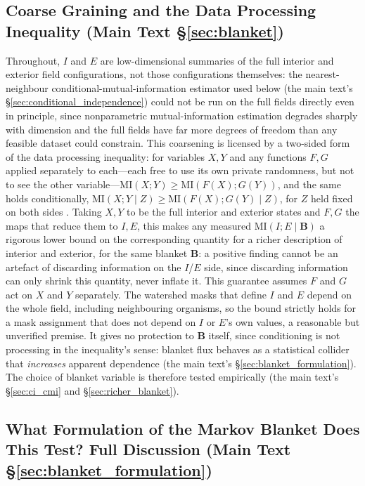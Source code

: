 \documentclass[11pt]{article}
\newcommand{\bB}{\boldsymbol{B}}
\begin{document}
\subsection{Coarse Graining and the Data Processing Inequality (Main Text \S\ref{sec:blanket})}
\label{sec:S_coarse}

Throughout, $I$ and $E$ are low-dimensional summaries of the full interior and exterior field configurations, not those configurations themselves: the nearest-neighbour conditional-mutual-information estimator used below (the main text's \S\ref{sec:conditional_independence}) could not be run on the full fields directly even in principle, since nonparametric mutual-information estimation degrades sharply with dimension and the full fields have far more degrees of freedom than any feasible dataset could constrain. This coarsening is licensed by a two-sided form of the data processing inequality: for variables $X,Y$ and any functions $F,G$ applied separately to each---each free to use its own private randomness, but not to see the other variable---$\mathrm{MI}(X;Y)\ge \mathrm{MI}(F(X);G(Y))$, and the same holds conditionally, $\mathrm{MI}(X;Y\mid Z)\ge \mathrm{MI}(F(X);G(Y)\mid Z)$, for $Z$ held fixed on both sides \citep{CoverThomas2006}. Taking $X,Y$ to be the full interior and exterior states and $F,G$ the maps that reduce them to $I,E$, this makes any measured $\mathrm{MI}(I;E\mid \bB{})$ a rigorous lower bound on the corresponding quantity for a richer description of interior and exterior, for the same blanket $\bB{}$: a positive finding cannot be an artefact of discarding information on the $I$/$E$ side, since discarding information can only shrink this quantity, never inflate it. This guarantee assumes $F$ and $G$ act on $X$ and $Y$ separately. The watershed masks that define $I$ and $E$ depend on the whole field, including neighbouring organisms, so the bound strictly holds for a mask assignment that does not depend on $I$ or $E$'s own values, a reasonable but unverified premise. It gives no protection to $\bB{}$ itself, since conditioning is not processing in the inequality's sense: blanket flux behaves as a statistical collider that \emph{increases} apparent dependence (the main text's \S\ref{sec:blanket_formulation}). The choice of blanket variable is therefore tested empirically (the main text's \S\ref{sec:ci_cmi} and \S\ref{sec:richer_blanket}).

\subsection{What Formulation of the Markov Blanket Does This Test? Full Discussion (Main Text \S\ref{sec:blanket_formulation})}
\label{sec:S_blanket_formulation}
\end{document}
